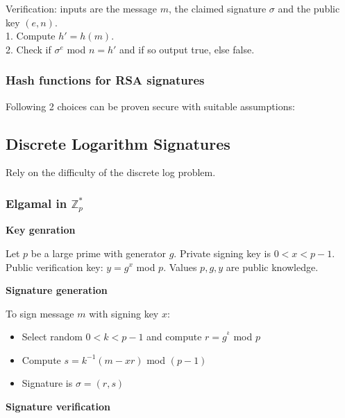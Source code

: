 \documentclass{article}
\begin{document}
Verification: inputs are the message $m$, the claimed signature $\sigma$ and the public key $(e,n)$.\\
1. Compute $h' = h(m).$\\
2. Check if $\sigma^e$ mod $n = h'$ and if so output true, else false.

\subsubsection{Hash functions for RSA signatures}

Following 2 choices can be proven secure with suitable assumptions:

\subsection{Discrete Logarithm Signatures}

Rely on the difficulty of the discrete log problem.

\subsubsection{Elgamal in $\mathbb{Z}_p^*$}

\textbf{Key genration}

Let $p$ be a large prime with generator $g$. Private signing key is $0 < x < p-1$.\\
Public verification key: $y = g^x$ mod $p$. Values $p, g, y$ are public knowledge.

\textbf{Signature generation}

To sign message $m$ with signing key $x$:
\begin{itemize}
    \item Select random $0<k<p-1$ and compute $r = g^^k$ mod $p$
    \item Compute $s = k^{-1}(m-xr)$ mod $(p-1)$
    \item Signature is $\sigma = (r,s)$
\end{itemize}

\textbf{Signature verification}
\end{document}
